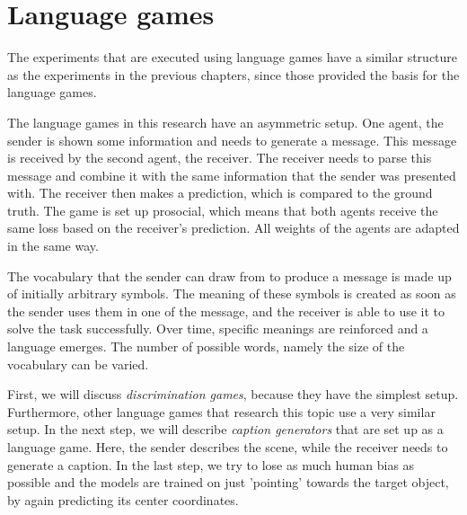 \section{Language games}
\label{sec:language-games}

The experiments that are executed using language games have a similar structure as the experiments in the previous chapters, since those provided the basis for the language games.

The language games in this research have an asymmetric setup.
One agent, the sender is shown some information and needs to generate a message.
This message is received by the second agent, the receiver.
The receiver needs to parse this message and combine it with the same information that the sender was presented with.
The receiver then makes a prediction, which is compared to the ground truth.
The game is set up prosocial, which means that both agents receive the same loss based on the receiver's prediction.
All weights of the agents are adapted in the same way.

The vocabulary that the sender can draw from to produce a message is made up of initially arbitrary symbols.
The meaning of these symbols is created as soon as the sender uses them in one of the message, and the receiver is able to use it to solve the task successfully.
Over time, specific meanings are reinforced and a language emerges.
The number of possible words, namely the size of the vocabulary can be varied.

First, we will discuss \emph{discrimination games}, because they have the simplest setup.
Furthermore, other language games that research this topic use a very similar setup.
In the next step, we will describe \emph{caption generators} that are set up as a language game.
Here, the sender describes the scene, while the receiver needs to generate a caption.
In the last step, we try to lose as much human bias as possible and the models are trained on just 'pointing' towards the target object, by again predicting its center coordinates.

